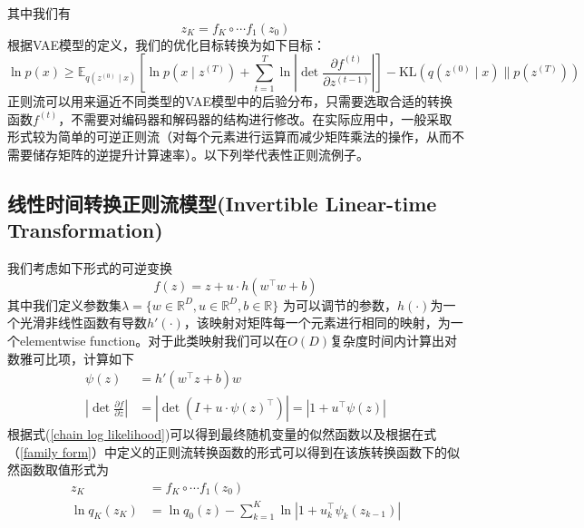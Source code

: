 其中我们有
\begin{equation}
    z_{K}=f_{K}\circ \cdots f_1(z_0)
    \label{z_K definition}
\end{equation}
根据VAE模型的定义，我们的优化目标转换为如下目标：
\begin{equation}
    \ln p({x}) \geq \mathbb{E}_{q\left({z}^{(0)} \mid {x}\right)}\left[\ln p\left({x} \mid {z}^{(T)}\right)+\sum_{t=1}^T \ln \left|\operatorname{det} \frac{\partial {f}^{(t)}}{\partial {z}^{(t-1)}}\right|\right]-\mathrm{KL}\left(q\left({z}^{(0)} \mid {x}\right) \| p\left({z}^{(T)}\right)\right)
    \label{NF objective}
    \end{equation}
正则流可以用来逼近不同类型的VAE模型中的后验分布，只需要选取合适的转换函数$f^{(t)}$，不需要对编码器和解码器的结构进行修改。在实际应用中，一般采取形式较为简单的可逆正则流（对每个元素进行运算而减少矩阵乘法的操作，从而不需要储存矩阵的逆提升计算速率）。以下列举代表性正则流例子。
\subsection{线性时间转换正则流模型(Invertible Linear-time Transformation)}
我们考虑如下形式的可逆变换
\begin{equation}
    f(z) = z+ u\cdot h(w^{\top } w + b)
    \label{family form}
\end{equation}
其中我们定义参数集$\lambda = \{w\in \mathbb{R}^{D}, u\in \mathbb{R}^D,b\in \mathbb{R}\}$ 为可以调节的参数，$h(\cdot)$为一个光滑非线性函数有导数$h'(\cdot)$，该映射对矩阵每一个元素进行相同的映射，为一个elementwise function。对于此类映射我们可以在$O(D)$复杂度时间内计算出对数雅可比项，计算如下
\begin{align}
    \psi(z) &= h'(w^{\top}z+b)w\\
    |\operatorname{det}\frac{\partial f}{\partial z}| &= |\operatorname{det}(I+u\cdot \psi(z)^{\top})|=|1+u^{\top}\psi(z)|
\end{align}
根据式(\ref{chain log likelihood})可以得到最终随机变量的似然函数以及根据在式（\ref{family form}）中定义的正则流转换函数的形式可以得到在该族转换函数下的似然函数取值形式为
\begin{align}
     z_{K} &=f_{K}\circ \cdots f_1(z_0) \\
     \ln q_{K}(z_{K})&= \ln q_0(z)-\sum_{k=1}^{K}\ln |1+u_{k}^{\top}\psi_{k}(z_{k-1})|
\end{align}

